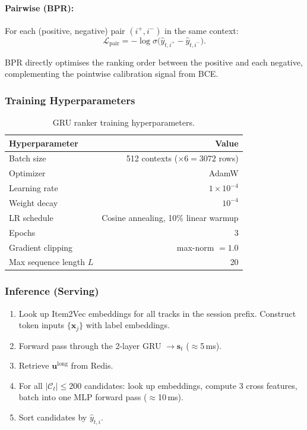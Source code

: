 \documentclass[11pt]{article}
\begin{document}
\paragraph{Pairwise (BPR):}
For each (positive, negative) pair $(i^+, i^-)$ in the same context:
\[
  \mathcal{L}_{\text{pair}}
  = -\log \sigma\!\bigl(
      \hat{y}_{t,i^+} - \hat{y}_{t,i^-}
    \bigr).
\]

BPR directly optimises the ranking order between the positive and each
negative, complementing the pointwise calibration signal from BCE.

\subsubsection{Training Hyperparameters}

\begin{table}[H]
\centering
\caption{GRU ranker training hyperparameters.}
\begin{tabular}{lr}
\toprule
\textbf{Hyperparameter} & \textbf{Value} \\
\midrule
Batch size & 512 contexts ($\times 6 = 3072$ rows) \\
Optimizer & AdamW \\
Learning rate & $1 \times 10^{-4}$ \\
Weight decay & $10^{-4}$ \\
LR schedule & Cosine annealing, 10\% linear warmup \\
Epochs & 3 \\
Gradient clipping & max-norm $= 1.0$ \\
Max sequence length $L$ & 20 \\
\bottomrule
\end{tabular}
\end{table}

\subsubsection{Inference (Serving)}

\begin{enumerate}
  \item Look up Item2Vec embeddings for all tracks in the session prefix.
        Construct token inputs $\{\mathbf{x}_j\}$ with label embeddings.
  \item Forward pass through the 2-layer GRU $\to \mathbf{s}_t$
        ($\approx$5\,ms).
  \item Retrieve $\mathbf{u}^{\text{long}}$ from Redis.
  \item For all $|\mathcal{C}_t| \le 200$ candidates:
        look up embeddings, compute 3 cross features,
        batch into one MLP forward pass ($\approx$10\,ms).
  \item Sort candidates by $\hat{y}_{t,i}$.
\end{enumerate}
\end{document}

